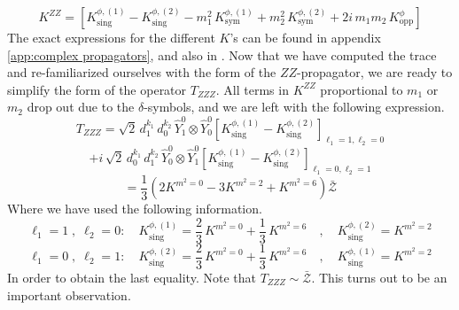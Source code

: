 %
%
\begin{equation}
K^{ZZ}
=
\left[
K^{\phi,(1)}_{\mathrm{sing}} - K^{\phi,(2)}_{\mathrm{sing}}
- m_1^2 \, K^{\phi,(1)}_{\mathrm{sym}}
+ m_2^2 \, K^{\phi,(2)}_{\mathrm{sym}}
+ 2i \, m_1 m_2 \, K^{\phi}_{\mathrm{opp}}
\right]
\end{equation}
%
%
The exact expressions for the different $K$'s can be found in appendix \ref{app:complex propagators}, and also in \cite{One-point functions in D3-D7}. Now that we have computed the trace and re-familiarized ourselves with the form of the $ZZ$-propagator, we are ready to simplify the form of the operator $T_{ZZZ}$. All terms in $K^{ZZ}$ proportional to $m_1$ or $m_2$ drop out due to the $\delta$-symbols, and we are left with the following expression.
%
%
\begin{equation*}
T_{ZZZ}
=
\sqrt{2} \, d_1^{k_1} \, d_0^{k_2} \, \hat{Y}^{0}_{1} \otimes \hat{Y}^{0}_{0}
\left[
K^{\phi,(1)}_{\mathrm{sing}} - K^{\phi,(2)}_{\mathrm{sing}}
\right]_{\ell_1=1,\ell_2=0}
\end{equation*}
%
%
\begin{equation*}
+
i \, \sqrt{2} \, d_0^{k_1} \, d_1^{k_2} \, \hat{Y}^{0}_{0} \otimes \hat{Y}^{0}_{1}
\left[
K^{\phi,(1)}_{\mathrm{sing}} - K^{\phi,(2)}_{\mathrm{sing}}
\right]_{\ell_1=0,\ell_2=1}
\end{equation*}
%
%
\begin{equation}
=
\frac{1}{3}
\left(
2 K^{m^2 = 0}
- 3 K^{m^2 = 2}
+ K^{m^2 = 6}
\right)
\bar{\mathcal{Z}}
\end{equation}
%
%
Where we have used the following information.
%
%
\begin{equation}
\ell_1 = 1 \; , \; \ell_2 = 0 : \quad
%
K^{\phi,(1)}_{\mathrm{sing}}
=
\frac{2}{3} \, K^{m^2 = 0}
+
\frac{1}{3} \, K^{m^2 = 6}
%
\quad , \quad
%
K^{\phi,(2)}_{\mathrm{sing}}
=
K^{m^2 = 2}
\end{equation}
%
%
\begin{equation}
\ell_1 = 0 \; , \; \ell_2 = 1 : \quad
%
K^{\phi,(2)}_{\mathrm{sing}}
=
\frac{2}{3} \, K^{m^2 = 0}
+
\frac{1}{3} \, K^{m^2 = 6}
%
\quad , \quad
%
K^{\phi,(1)}_{\mathrm{sing}}
=
K^{m^2 = 2}
\end{equation}
%
%
In order to obtain the last equality. Note that $T_{ZZZ} \sim \mathcal{\bar{Z}}$. This turns out to be an important observation.

